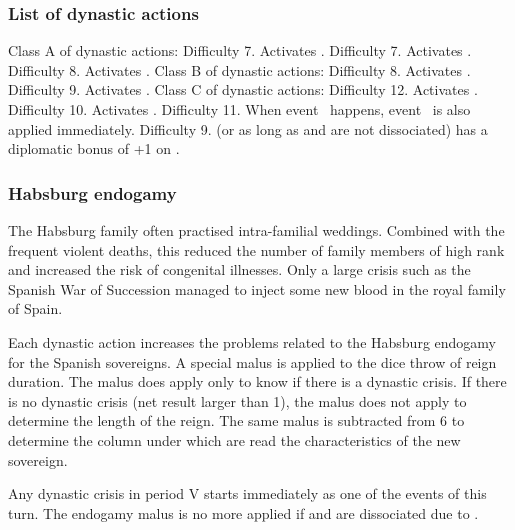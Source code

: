 \subsubsection{List of dynastic actions}
\aparag Class A of dynastic actions:
Difficulty 7. Activates .
 Difficulty 7. Activates
.
Difficulty 8. Activates .
\aparag Class B of dynastic actions:
 Difficulty 8. Activates .
 Difficulty 9. Activates .
\aparag Class C of dynastic actions:
 Difficulty 12. Activates
.
 Difficulty
10. Activates .
 Difficulty 11. When
event~ happens,
event~ is also applied immediately.
 Difficulty 9. \HAB (or \SPA as long as \SPA
and \HAB are not dissociated) has a diplomatic bonus of +1 on
.


\subsubsection{Habsburg endogamy}
\begin{histoire}
  The Habsburg family often practised intra-familial weddings. Combined
  with the frequent violent deaths, this reduced the number of family
  members of high rank and increased the risk of congenital
  illnesses. Only a large crisis such as the Spanish War of Succession
  managed to inject some new blood in the royal family of Spain.
\end{histoire}
\aparag Each dynastic action increases the problems related to the
Habsburg endogamy for the Spanish sovereigns.
\bparag A special malus is applied to the dice throw of reign
duration. The malus does apply only to know if there is a dynastic
crisis. If there is no dynastic crisis (net result larger than 1), the
malus does not apply to determine the length of the reign.
\bparag The same malus is subtracted from 6 to determine the column
under which are read the characteristics of the new sovereign.
\dynasticactionsrecapfalse {}

 Any dynastic crisis in period V
starts immediately  as one of the events of this turn.
\bparag The endogamy malus is no more applied if \SPA and \HAB are
dissociated due to .


